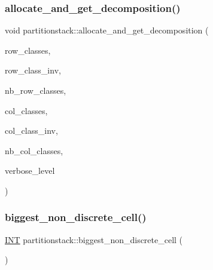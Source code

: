\subsubsection{\texorpdfstring{allocate\+\_\+and\+\_\+get\+\_\+decomposition()}{allocate\_and\_get\_decomposition()}}
{\footnotesize\ttfamily void partitionstack\+::allocate\+\_\+and\+\_\+get\+\_\+decomposition (\begin{DoxyParamCaption}\item[{\mbox{\hyperlink{galois_8h_a09fddde158a3a20bd2dcadb609de11dc}{I\+NT}} $\ast$\&}]{row\+\_\+classes,  }\item[{\mbox{\hyperlink{galois_8h_a09fddde158a3a20bd2dcadb609de11dc}{I\+NT}} $\ast$\&}]{row\+\_\+class\+\_\+inv,  }\item[{\mbox{\hyperlink{galois_8h_a09fddde158a3a20bd2dcadb609de11dc}{I\+NT}} \&}]{nb\+\_\+row\+\_\+classes,  }\item[{\mbox{\hyperlink{galois_8h_a09fddde158a3a20bd2dcadb609de11dc}{I\+NT}} $\ast$\&}]{col\+\_\+classes,  }\item[{\mbox{\hyperlink{galois_8h_a09fddde158a3a20bd2dcadb609de11dc}{I\+NT}} $\ast$\&}]{col\+\_\+class\+\_\+inv,  }\item[{\mbox{\hyperlink{galois_8h_a09fddde158a3a20bd2dcadb609de11dc}{I\+NT}} \&}]{nb\+\_\+col\+\_\+classes,  }\item[{\mbox{\hyperlink{galois_8h_a09fddde158a3a20bd2dcadb609de11dc}{I\+NT}}}]{verbose\+\_\+level }\end{DoxyParamCaption})}

\mbox{\label{classpartitionstack_a364dbccc100666a2f567403d0a42ddcc}} 
\subsubsection{\texorpdfstring{biggest\+\_\+non\+\_\+discrete\+\_\+cell()}{biggest\_non\_discrete\_cell()}}
{\footnotesize\ttfamily \mbox{\hyperlink{galois_8h_a09fddde158a3a20bd2dcadb609de11dc}{I\+NT}} partitionstack\+::biggest\+\_\+non\+\_\+discrete\+\_\+cell (\begin{DoxyParamCaption}{ }\end{DoxyParamCaption})}

\mbox{\label{classpartitionstack_afac36ae1992b98a7f833447c231b9987}} 

